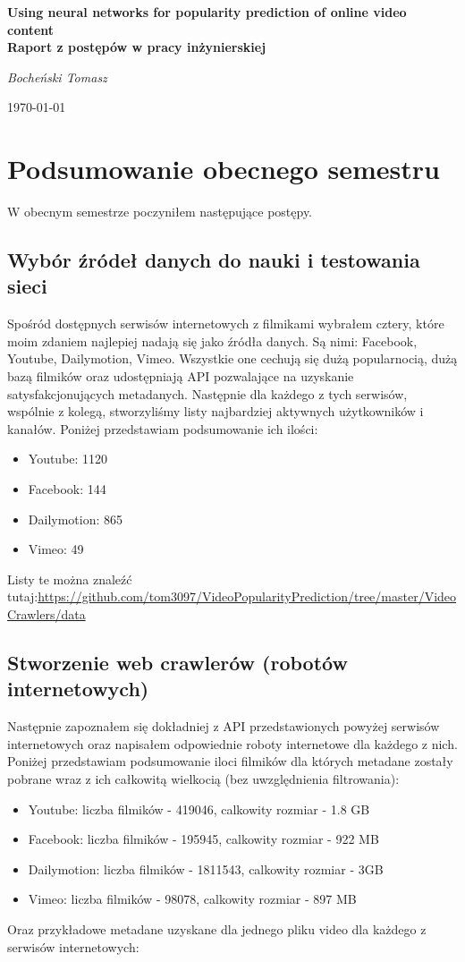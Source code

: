\documentclass{article}
\begin{document}
\begingroup
    \centering
    \huge\textbf{Using neural networks for popularity prediction of online video content}\\[0.75em]
    \large\textbf{Raport z postępów w pracy inżynierskiej}\\[0.75em]
    \vspace{0.2cm}
    {\large{}\itshape{} Bocheński Tomasz\par{}}
    \vspace{0.5cm}
    {\large \today\par}
\endgroup


\section{Podsumowanie obecnego semestru}
W obecnym semestrze poczyniłem następujące postępy.

\subsection{Wybór źródeł danych do nauki i testowania sieci}
Spośród dostępnych serwisów internetowych z filmikami wybrałem cztery, które moim zdaniem najlepiej nadają się jako źródła danych. Są nimi: Facebook, Youtube, Dailymotion, Vimeo. Wszystkie one cechują się dużą popularnocią, dużą bazą filmików oraz udostępniają API pozwalające na uzyskanie satysfakcjonujących metadanych. Następnie dla każdego z tych serwisów, wspólnie z kolegą, stworzyliśmy listy najbardziej aktywnych użytkowników i kanałów. Poniżej przedstawiam podsumowanie ich ilości:
\begin{itemize}
    \item Youtube: 1120
    \item Facebook: 144
    \item Dailymotion: 865
    \item Vimeo: 49
\end{itemize}
Listy te można znaleźć tutaj:\url{https://github.com/tom3097/VideoPopularityPrediction/tree/master/VideoCrawlers/data}

\subsection{Stworzenie web crawlerów (robotów internetowych)}
Następnie zapoznałem się dokładniej z API przedstawionych powyżej serwisów internetowych oraz napisałem odpowiednie roboty internetowe dla każdego z nich. Poniżej przedstawiam podsumowanie iloci filmików dla których metadane zostały pobrane wraz z ich całkowitą wielkocią (bez uwzględnienia filtrowania):
\begin{itemize}
    \item Youtube: liczba filmików - 419046, calkowity rozmiar - 1.8 GB
    \item Facebook: liczba filmików - 195945, calkowity rozmiar - 922 MB
    \item Dailymotion: liczba filmików - 1811543, calkowity rozmiar - 3GB
    \item Vimeo: liczba filmików - 98078, calkowity rozmiar - 897 MB
\end{itemize}
Oraz przykładowe metadane uzyskane dla jednego pliku video dla każdego z serwisów internetowych:
\end{document}

